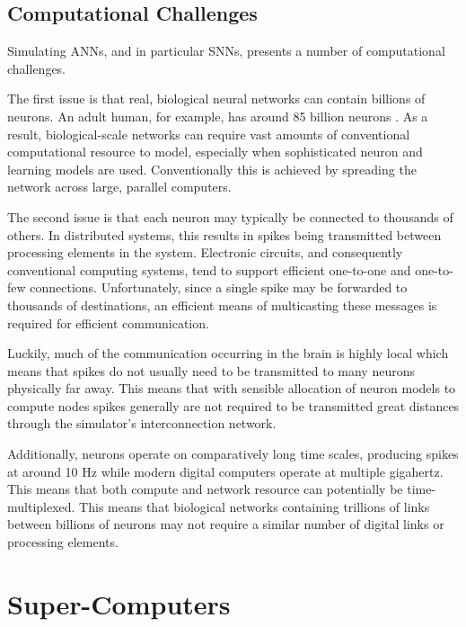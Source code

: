 		
		\subsection{Computational Challenges}
			
			Simulating ANNs, and in particular SNNs, presents a number of
			computational challenges.
			
			The first issue is that real, biological neural networks can contain
			billions of neurons. An adult human, for example, has around 85 billion
			neurons \cite{herculano09}. As a result, biological-scale networks can
			require vast amounts of conventional computational resource to model,
			especially when sophisticated neuron and learning models are used.
			Conventionally this is achieved by spreading the network across large,
			parallel computers.
			
			The second issue is that each neuron may typically be connected to
			thousands of others. In distributed systems, this results in spikes being
			transmitted between processing elements in the system. Electronic
			circuits, and consequently conventional computing systems, tend to support
			efficient one-to-one and one-to-few connections. Unfortunately, since a
			single spike may be forwarded to thousands of destinations, an efficient
			means of multicasting these messages is required for efficient
			communication.
			
			Luckily, much of the communication occurring in the brain is highly local
			which means that spikes do not usually need to be transmitted to many
			neurons physically far away. This means that with sensible allocation of
			neuron models to compute nodes spikes generally are not required to be
			transmitted great distances through the simulator's interconnection
			network.
			
			Additionally, neurons operate on comparatively long time scales, producing
			spikes at around 10 Hz while modern digital computers operate at multiple
			gigahertz. This means that both compute and network resource can
			potentially be time-multiplexed. This means that biological networks
			containing trillions of links between billions of neurons may not require
			a similar number of digital links or processing elements.
	
	
	\section{Super-Computers}
		
